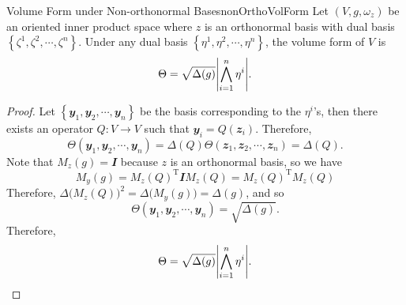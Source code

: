 \documentclass[math]{amznotes}
\theoremstyle{remark}
\newcommand{\I}{\mathbfit{I}}
\begin{document}
\begin{probox}{Volume Form under Non-orthonormal Bases}{nonOrthoVolForm}
    Let $(V, g, \omega_z)$ be an oriented inner product space where $z$ is an orthonormal basis with dual basis $\left\{\zeta^1, \zeta^2, \cdots, \zeta^n\right\}$. Under any dual basis $\left\{\eta^1, \eta^2, \cdots, \eta^n\right\}$, the volume form of $V$ is 
    \begin{equation*}
        \Theta = \sqrt{\Delta(g)}{\left\lvert {\bigwedge_{i = 1}^n\eta^i} \right\rvert}.
    \end{equation*}
    \tcblower
    \begin{proof}
        Let $\left\{\mathbfit{y}_1, \mathbfit{y}_2, \cdots, \mathbfit{y}_n\right\}$ be the basis corresponding to the $\eta^i$'s, then there exists an operator $Q \colon V \to V$ such that $\mathbfit{y}_i = Q\left(\mathbfit{z}_i\right)$. Therefore, 
        \begin{equation*}
            \Theta\left(\mathbfit{y}_1, \mathbfit{y}_2, \cdots, \mathbfit{y}_n\right) = \Delta(Q)\Theta\left(\mathbfit{z}_1, \mathbfit{z}_2, \cdots, \mathbfit{z}_n\right) = \Delta(Q).
        \end{equation*}
        Note that $M_z(g) = \I$ because $z$ is an orthonormal basis, so we have 
        \begin{equation*}
            M_y(g) = M_z(Q)^{\mathrm{T}}\I M_z(Q) = M_z(Q)^{\mathrm{T}}M_z(Q)
        \end{equation*}
        Therefore, $\Delta\bigl(M_z(Q)\bigr)^2 = \Delta\bigl(M_y(g)\bigr) = \Delta(g)$, and so 
        \begin{equation*}
            \Theta\left(\mathbfit{y}_1, \mathbfit{y}_2, \cdots, \mathbfit{y}_n\right) = \sqrt{\Delta(g)}.
        \end{equation*}
        Therefore, 
        \begin{equation*}
            \Theta = \sqrt{\Delta(g)}{\left\lvert {\bigwedge_{i = 1}^n\eta^i} \right\rvert}.
        \end{equation*}
    \end{proof}
\end{probox}
\end{document}
